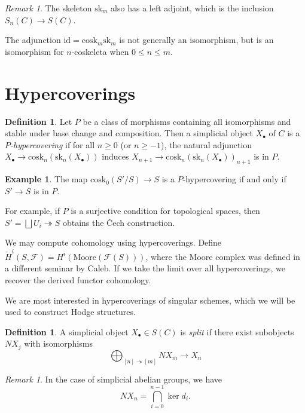 \documentclass[leqno, openany]{memoir}
\theoremstyle{definition}
\newtheorem{defn}[thm]{Definition}
\newtheorem{exm}[thm]{Example}
\theoremstyle{remark}
\newtheorem{rmk}[thm]{Remark}
\theoremstyle{plain}
\theoremstyle{definition}
\theoremstyle{remark}
\newcommand{\mc}[1]{\mathcal{#1}}
\newcommand{\mr}[1]{\mathrm{#1}}
\begin{document}
\begin{rmk}
    The skeleton $\mr{sk}_m$ also has a left adjoint, which is the inclusion $S_n(C) \to S(C)$.
\end{rmk}

The adjunction $\mr{id} = \mr{cosk}_m \mr{sk}_m$ is not generally an isomorphism, but is an isomorphism for $n$-coskeleta when $0 \leq n \leq m$.

\section{Hypercoverings}%
\label{sec:hypercoverings}

\begin{defn}
    Let $P$ be a class of morphisms containing all isomorphisms and stable under base change and composition. Then a simplicial object $X_{\bullet}$ of $C$ is a \textit{$P$-hypercovering} if for all $n \geq 0$ (or $n \geq -1$), the natural adjunction $X_{\bullet} \to \mr{cosk}_n(\mr{sk}_n(X_{\bullet}))$ induces $X_{n+1} \to \mr{cosk}_n(\mr{sk}_n(X_{\bullet}))_{n+1}$ is in $P$.
\end{defn}

\begin{exm}
    The map $\mr{cosk}_0(S' / S) \to S$ is a $P$-hypercovering if and only if $S' \to S$ is in $P$. 
\end{exm}

For example, if $P$ is a surjective condition for topological spaces, then $S' = \bigsqcup U_i \twoheadrightarrow S$ obtains the \v{C}ech construction.

We may compute cohomology using hypercoverings. Define $\check{H}^i(S, \mc{F}) = H^i(\mr{Moore}(\mc{F}(S)))$, where the Moore complex was defined in a different seminar by Caleb. If we take the limit over all hypercoverings, we recover the derived functor cohomology.

We are most interested in hypercoverings of singular schemes, which we will be used to construct Hodge structures.

\begin{defn}
    A simplicial object $X_{\bullet} \in S(C)$ is \textit{split} if there exist subobjects $NX_j$ with isomorphisms 
    \[ \bigoplus_{[n] \twoheadrightarrow [m]} N X_m \to X_n \]
\end{defn}

\begin{rmk}
    In the case of simplicial abelian groups, we have
    \[ NX_n = \bigcap_{i=0}^{n-1} \ker d_i. \]
\end{rmk}
\end{document}
